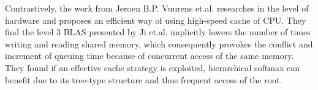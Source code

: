Contrastively, the work from Jeroen B.P. Vuurens et.al. \cite{eickhoff2016efficient} researches in the level of hardware and proposes an efficient way of using high-speed cache of CPU. They find the level 3 BLAS presented by Ji et.al. implicitly lowers the number of times writing and reading shared memory, which consequently provokes the conflict and increment of queuing time because of concurrent access of the same memory. They found if an effective cache strategy is exploited, hierarchical softmax can benefit due to its tree-type structure and  thus frequent access of the root.
